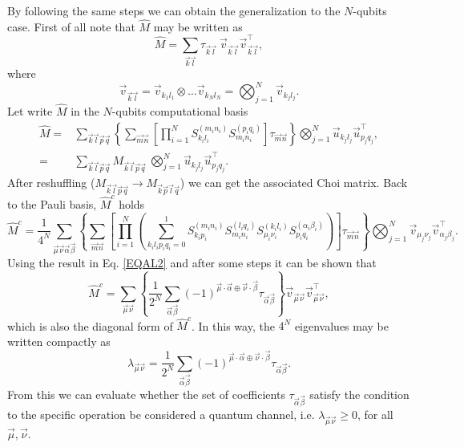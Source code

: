 By following the same steps we can obtain the generalization to the $N$-qubits case. First of all note that $\hat{M}$ may be written as
%
\begin{equation}
 \hat{M}=\sum_{\vec{k}\vec{l}}\tau_{\vec{k}\vec{l}}~\vec{v}_{\vec{k}\vec{l}}\vec{v}_{\vec{k}\vec{l}}^\intercal,
\end{equation}
% 
where
% 
\begin{equation}
 \vec{v}_{\vec{k}\vec{l}}=\vec{v}_{k_1l_1}\otimes\dots\vec{v}_{k_Nl_N}=\bigotimes_{j=1}^N\vec{v}_{k_jl_j}.
\end{equation}
% 
Let write $\hat{M}$ in the $N$-qubits computational basis
% 
\begin{align}
 \hat{M}=&\sum_{\vec{k}\vec{l}\vec{p}\vec{q}}\left\{\sum_{\vec{m}\vec{n}} \left[ \prod_{i=1}^N S_{k_il_i}^{(m_in_i)}S_{m_in_i}^{(p_iq_i)} \right] \tau_{\vec{m}\vec{n}} \right\} \bigotimes_{j=1}^N\vec{u}_{k_jl_j}\vec{u}_{p_jq_j}^\intercal,\\
 =&\sum_{\vec{k}\vec{l}\vec{p}\vec{q}} M_{\vec{k}\vec{l}\vec{p}\vec{q}} ~\bigotimes_{j=1}^N\vec{u}_{k_jl_j}\vec{u}_{p_jq_j}^\intercal.
\end{align}
% 
After reshuffling ($M_{\vec{k}\vec{l}\vec{p}\vec{q}}\to M_{\vec{k}\vec{p}\vec{l}\vec{q}}$) we can get the associated Choi matrix. Back to the Pauli basis, $\hat{M}^c$ holds
%
\begin{equation}
 \hat{M}^c=\frac{1}{4^N}\sum_{\vec{\mu}\vec{\nu}\vec{\alpha}\vec{\beta}}\left\{\sum_{\vec{m}\vec{n}}\left[\prod_{i=1}^N\left(\sum_{k_il_ip_iq_i=0}^1 S_{k_ip_i}^{(m_in_i)} S_{m_in_i}^{(l_iq_i)}S_{\mu_i\nu_i}^{(k_il_i)}S_{p_iq_i}^{(\alpha_i\beta_i)}\right)\right]\tau_{\vec{m}\vec{n}}\right\} \bigotimes_{j=1}^N\vec{v}_{\mu_j\nu_j}\vec{v}_{\alpha_j\beta_j}^\intercal.
\end{equation}
% 
Using the result in Eq. \ref{EQAL2} and after some steps it can be shown that
%
\begin{equation}
 \hat{M}^c=\sum_{\vec{\mu}\vec{\nu}}\left\{\frac{1}{2^N}\sum_{\vec{\alpha}\vec{\beta}}(-1)^{\vec{\mu}\cdot\vec{\alpha}\oplus \vec{\nu}\cdot\vec{\beta}}\tau_{\vec{\alpha}\vec{\beta}}\right\}\vec{v}_{\vec{\mu}\vec{\nu}}\vec{v}_{\vec{\mu}\vec{\nu}}^\intercal,
\end{equation}
% 
which is also the diagonal form of $\hat{M}^c$. In this way, the $4^N$ eigenvalues may be written compactly as
% 
\begin{equation}
 \lambda_{\vec{\mu}\vec{\nu}}=\frac{1}{2^N}\sum_{\vec{\alpha}\vec{\beta}}(-1)^{\vec{\mu}\cdot\vec{\alpha}\oplus \vec{\nu}\cdot\vec{\beta}}\tau_{\vec{\alpha}\vec{\beta}}.
\end{equation}
% 
From this we can evaluate whether the set of coefficients $\tau_{\vec{\alpha}\vec{\beta}}$ satisfy the condition to the specific operation be considered a quantum channel, i.e. $\lambda_{\vec{\mu}\vec{\nu}}\geq 0$, for all $\vec{\mu},\vec{\nu}$.
 
